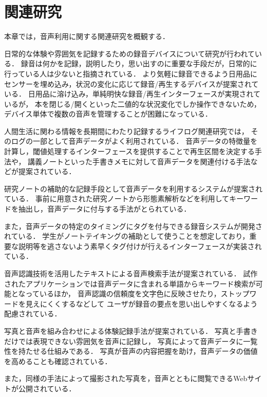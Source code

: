 \chapter{関連研究}
\label{chap:previous}

本章では，音声利用に関する関連研究を概観する．

\newpage

日常的な体験や雰囲気を記録するための録音デバイスについて研究が行われている\cite{Poupyrev}．
録音は何かを記録，説明したり，思い出すのに重要な手段だが，日常的に行っている人は少ないと指摘されている．
より気軽に録音できるよう日用品にセンサーを埋め込み，状況の変化に応じて録音/再生するデバイスが提案されている．
日用品に溶け込み，単純明快な録音/再生インターフェースが実現されているが，
本を閉じる/開くといった二値的な状況変化でしか操作できないため，
デバイス単体で複数の音声を管理することが困難になっている．

人間生活に関わる情報を長期間にわたり記録するライフログ関連研究では，
そのログの一部として音声データがよく利用されている\cite{Bell}．
音声データの特徴量を計算し，閾値処理するインターフェースを提供することで再生区間を決定する手法\cite{Kawamura}や，
講義ノートといった手書きメモに対して音声データを関連付ける手法\cite{Stifelman}などが提案されている．

研究ノートの補助的な記録手段として音声データを利用するシステムが提案されている\cite{Kawanishi}．
事前に用意された研究ノートから形態素解析などを利用してキーワードを抽出し，音声データに付与する手法がとられている．

また，音声データの特定のタイミングにタグを付与できる録音システムが開発されている\cite{Fujisaka}．
学生がノートテイキングの補助として使うことを想定しており，重要な説明等を逃さないよう素早くタグ付けが行えるインターフェースが実装されている．

音声認識技術を活用したテキストによる音声検索手法が提案されている\cite{Vemuri}．
試作されたアプリケーションでは音声データに含まれる単語からキーワード検索が可能となっているほか，
音声認識の信頼度を文字色に反映させたり，ストップワードを見えにくくするなどして
ユーザが録音の要点を思い出しやすくなるよう配慮されている．

写真と音声を組み合わせによる体験記録手法が提案されている\cite{Nakakura}．
写真と手書きだけでは表現できない雰囲気を音声に記録し，
写真によって音声データに一覧性を持たせる仕組みである．
写真が音声の内容把握を助け，音声データの価値を高めることも確認されている．

また，同様の手法によって撮影された写真を，音声とともに閲覧できるWebサイトが公開されている\cite{Masui}．

